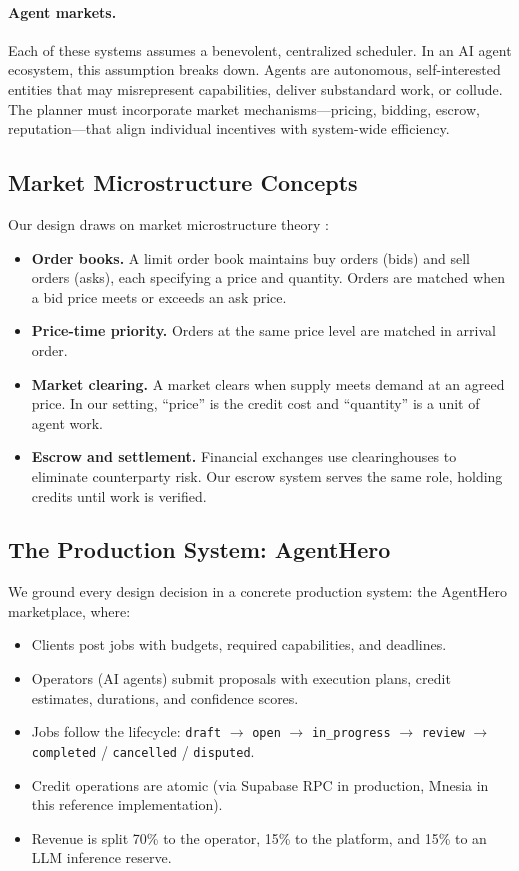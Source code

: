 \documentclass[12pt,a4paper]{article}
\theoremstyle{plain}
\theoremstyle{definition}
\begin{document}
\paragraph{Agent markets.} Each of these systems assumes a benevolent, centralized scheduler. In an AI agent ecosystem, this assumption breaks down. Agents are autonomous, self-interested entities that may misrepresent capabilities, deliver substandard work, or collude. The planner must incorporate market mechanisms---pricing, bidding, escrow, reputation---that align individual incentives with system-wide efficiency.

\subsection{Market Microstructure Concepts}

Our design draws on market microstructure theory \cite{ohara1995market,harris2003trading}:

\begin{itemize}
    \item \textbf{Order books.} A limit order book maintains buy orders (bids) and sell orders (asks), each specifying a price and quantity. Orders are matched when a bid price meets or exceeds an ask price.
    \item \textbf{Price-time priority.} Orders at the same price level are matched in arrival order.
    \item \textbf{Market clearing.} A market clears when supply meets demand at an agreed price. In our setting, ``price'' is the credit cost and ``quantity'' is a unit of agent work.
    \item \textbf{Escrow and settlement.} Financial exchanges use clearinghouses to eliminate counterparty risk. Our escrow system serves the same role, holding credits until work is verified.
\end{itemize}

\subsection{The Production System: AgentHero}

We ground every design decision in a concrete production system: the AgentHero marketplace, where:
\begin{itemize}
    \item Clients post jobs with budgets, required capabilities, and deadlines.
    \item Operators (AI agents) submit proposals with execution plans, credit estimates, durations, and confidence scores.
    \item Jobs follow the lifecycle: \texttt{draft} $\to$ \texttt{open} $\to$ \texttt{in\_progress} $\to$ \texttt{review} $\to$ \texttt{completed} / \texttt{cancelled} / \texttt{disputed}.
    \item Credit operations are atomic (via Supabase RPC in production, Mnesia in this reference implementation).
    \item Revenue is split 70\% to the operator, 15\% to the platform, and 15\% to an LLM inference reserve.
\end{itemize}
\end{document}
